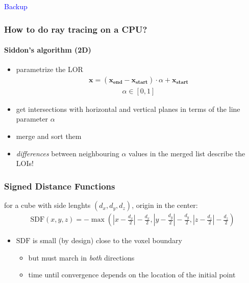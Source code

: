 \documentclass{beamer}
\begin{document}

\begin{frame}
  \begin{center}
    \huge
    \textcolor{blue}{Backup}
  \end{center}
\end{frame}

\begin{frame}
  \frametitle{How to do ray tracing on a CPU?}
  \framesubtitle{Siddon's algorithm (2D)}
  \begin{itemize}
    \item parametrize the LOR
      \begin{align*} \mathbf{x} = (\mathbf{x_{end}} - \mathbf{x_{start}}) \cdot \alpha + \mathbf{x_{start}} \end{align*}
      \begin{align*} \alpha \in [0,1] \end{align*}
    \item get intersections with horizontal and vertical planes in terms of the line parameter $\alpha$
    \item merge and sort them
    \item \textsl{differences} between neighbouring $\alpha$ values in the merged list describe the LOIs!
  \end{itemize}
\end{frame}

\begin{frame}
  \frametitle{Signed Distance Functions}
  for a cube with side lenghts $(d_x, d_y, d_z)$, origin in the center:
  \begin{align*}
    \text{SDF}(x, y, z) = -\max\left(\left| x - \frac{d_x}{2} \right| - \frac{d_x}{2}, \left| y - \frac{d_y}{2} \right| - \frac{d_y}{2}, \left| z - \frac{d_z}{2} \right| - \frac{d_z}{2}\right)
  \end{align*}

  \begin{itemize}
  \item $\text{SDF}$ is small (by design) close to the voxel boundary
    \begin{itemize}
    \item but must march in \textsl{both} directions
    \item time until convergence depends on the location of the initial point
    \end{itemize}
  \end{itemize}

\end{frame}
\end{document}
